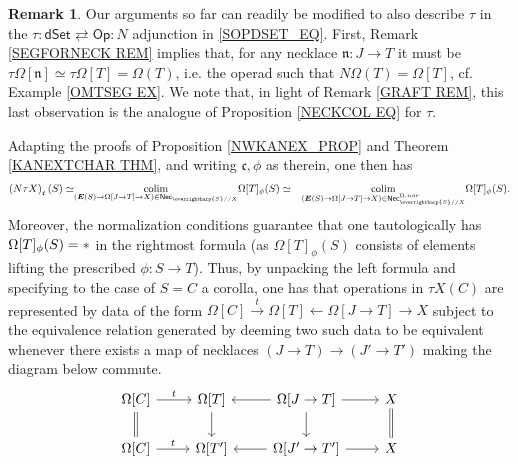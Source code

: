 \documentclass[a4paper,10pt
,draft
]{article}%
\numberwithin{equation}{section}
\numberwithin{figure}{section}
\theoremstyle{definition} %
\newtheorem{remark}[equation]{Remark}%
\newcommand{\vect}[1]{\text{\overrightharp{\ensuremath{#1}}}}
\newcommand{\Op}{\mathsf{Op}}%
\newcommand{\dSet}{\mathsf{dSet}}
\DeclareMathOperator{\colim}{colim}%
\newcommand{\1}{\ensuremath{\mathbbm 1}}%
\begin{document}
\begin{remark}\label{TAUFUNEX REM}
	Our arguments so far can readily be modified 
	to also describe $\tau$ in the 
	$\tau \colon \dSet \rightleftarrows \Op \colon N$
	adjunction in \eqref{SOPDSET_EQ}.
	First, Remark \ref{SEGFORNECK REM} implies that,
	for any necklace 
	$\mathfrak{n} \colon J \to T$ it must be 
	$\tau \Omega[\mathfrak{n}] \simeq
	\tau \Omega[T] = \Omega(T)$,
	i.e. the operad such that $N\Omega(T) = \Omega[T]$,
	cf. Example \ref{OMTSEG EX}.
	We note that, in light of Remark \ref{GRAFT REM},
	this last observation is the analogue of 
	Proposition \ref{NECKCOL EQ} for $\tau$.
	
	Adapting the proofs of 
	Proposition \ref{NWKANEX_PROP} and
	Theorem \ref{KANEXTCHAR THM},
	and writing $\mathfrak{c},\phi$ as therein, one then has
\begin{equation}
\begin{aligned}
	\left(N \tau X\right)_{\mathfrak{c}}(S) 
	\simeq &
\underset{(\boldsymbol{E}(S) \to 
	\Omega[J \to T] \to X)
	\in \mathsf{Nec}_{\vect{S}//X}}{\colim}
	\Omega[T]_{\phi}(S)
	\simeq &
\underset{(\boldsymbol{E}(S) \to 
	\Omega[J \to T] \to X)
	\in \mathsf{Nec}^{\Omega,nor}_{\vect{S}//X}}{\colim}
	\Omega[T]_{\phi}(S).
\end{aligned}
\end{equation}
Moreover, the normalization conditions guarantee
that one tautologically has  
$\Omega[T]_{\phi}(S) = \**$
in the rightmost formula
(as $\Omega[T]_{\phi}(S)$ consists of elements lifting the prescribed $\phi\colon S \to T$).
Thus, by unpacking the left formula and specifying to the case of
$S=C$ a corolla,
one has that operations in
$\tau X(C)$
are represented by 
data of the form
$
	\Omega[C]
	\xrightarrow{t}
	\Omega[T]
	\leftarrow
	\Omega[J \to T]
	\to X
$
subject to the equivalence relation
generated by deeming two such data to be equivalent whenever there exists a map of necklaces
$(J \to T) \to (J' \to T')$
making the diagram below commute.
\[
\begin{tikzcd}
	\Omega[C] \ar{r}{t} \ar[equal]{d} &
	\Omega[T] \ar{d} &
	\Omega[J \to T] \ar{l} \ar{r} \ar{d} &
	X \ar[equal]{d}
\\
	\Omega[C] \ar{r}{t} &
	\Omega[T'] &
	\Omega[J' \to T'] \ar{l} \ar{r} &
	X
\end{tikzcd}
\]
\end{remark}
\end{document}
